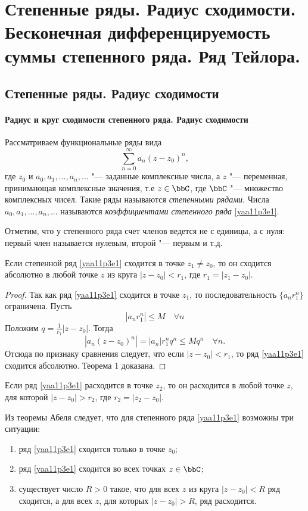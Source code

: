 \chapter{Степенные ряды. Радиус сходимости. Бесконечная дифференцируемость суммы степенного ряда. Ряд Тейлора.}
\section{Степенные ряды. Радиус сходимости}
\subsubsection{Радиус и круг сходимости степенного ряда. Радиус сходимости}
Рассматриваем функциональные ряды вида
\begin{equation}\label{yaa11p3e1}
\sum\limits_{n=0}^{\infty} a_n(z-z_0)^n,
\end{equation}
где $z_0$ и $a_0,a_1,...,a_n,...$ "--- заданные комплексные числа, а $z$ "--- переменная, принимающая комплексные значения, т.е $z\in\bbC$, где $\bbC$ "--- множество комплексных чисел. Такие ряды называются \textit{степенными рядами}. Числа $a_0,a_1,...,a_n,...$ называются \textit{коэффициентами степенного ряда} \eqref{yaa11p3e1}.

Отметим, что у степенного ряда счет членов ведется не с единицы, а с нуля: первый член называется нулевым, второй "--- первым и т.д.

\begin{thm}
Если степенной ряд \eqref{yaa11p3e1} сходится в точке $z_1\ne z_0$, то он сходится абсолютно в любой точке $z$ из круга $|z-z_0|<r_1$, где $r_1=|z_1-z_0|$.
\end{thm}

\begin{proof}
Так как ряд \eqref{yaa11p3e1} сходится в точке $z_1$, то последовательность $\{a_n r_1^n\}$ ограничена. Пусть
$$
|a_nr_1^n|\le M \quad \forall n
$$
Положим $q=\frac{1}{r_1}|z-z_0|$. Тогда
$$
|a_n(z-z_0)^n|=|a_n|r_1^nq^n\le Mq^n\quad \forall n.
$$
Отсюда по признаку сравнения следует, что если $|z-z_0|<r_1$, то ряд \eqref{yaa11p3e1} сходится абсолютно. Теорема 1 доказана.
\end{proof}

\begin{cons}
Если ряд \eqref{yaa11p3e1} расходится в точке $z_2$, то он расходится в любой точке $z$, для которой $|z-z_0|>r_2$, где $r_2=|z_2-z_0|$.
\end{cons}

Из теоремы Абеля следует, что для степенного ряда \eqref{yaa11p3e1} возможны три ситуации:
\begin{enumerate}
\item ряд \eqref{yaa11p3e1} сходится только в точке $z_0$;
\item ряд \eqref{yaa11p3e1} сходится во всех точках $z\in\bbC$;
\item существует число $R>0$ такое, что для всех $z$ из круга $|z-z_0|<R$ ряд сходится, а для всех $z$, для которых $|z-z_0|>R$, ряд расходится.
\end{enumerate}

